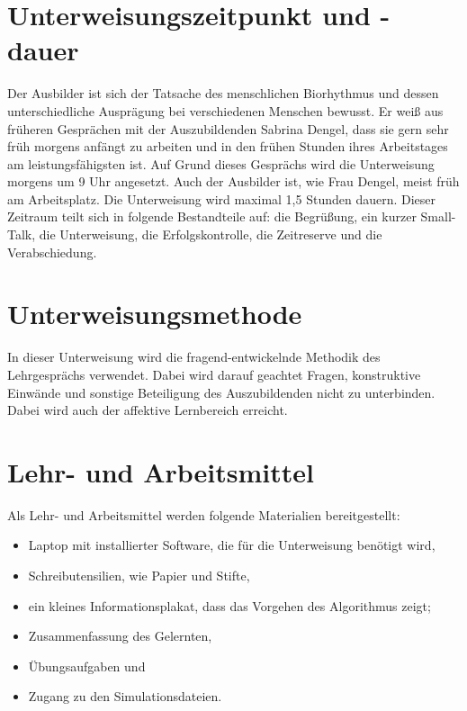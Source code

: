 \section{Unterweisungszeitpunkt und -dauer}
Der Ausbilder ist sich der Tatsache des menschlichen Biorhythmus und dessen unterschiedliche Ausprägung bei verschiedenen Menschen bewusst. Er weiß aus früheren Gesprächen mit der Auszubildenden Sabrina Dengel, dass sie gern sehr früh morgens anfängt zu arbeiten und in den frühen Stunden ihres Arbeitstages am leistungsfähigsten ist. Auf Grund dieses Gesprächs wird die Unterweisung morgens um 9 Uhr angesetzt. Auch der Ausbilder ist, wie Frau Dengel, meist früh am Arbeitsplatz. Die Unterweisung wird maximal 1,5 Stunden dauern. Dieser Zeitraum teilt sich in folgende Bestandteile auf: die Begrüßung, ein kurzer Small-Talk, die Unterweisung, die Erfolgskontrolle, die Zeitreserve und die Verabschiedung.   

\section{Unterweisungsmethode}
In dieser Unterweisung wird die fragend-entwickelnde Methodik des Lehrgesprächs verwendet. Dabei wird darauf geachtet Fragen, konstruktive Einwände und sonstige Beteiligung des Auszubildenden nicht zu unterbinden. Dabei wird auch der affektive Lernbereich erreicht. 

\section{Lehr- und Arbeitsmittel}
Als Lehr- und Arbeitsmittel werden folgende Materialien bereitgestellt: 
\begin{itemize}
	\item Laptop mit installierter Software, die für die Unterweisung benötigt wird,
	\item Schreibutensilien, wie Papier und Stifte, 
	\item ein kleines Informationsplakat, dass das Vorgehen des Algorithmus zeigt;
	\item Zusammenfassung des Gelernten,
	\item Übungsaufgaben und 
	\item Zugang zu den Simulationsdateien.
\end{itemize}


